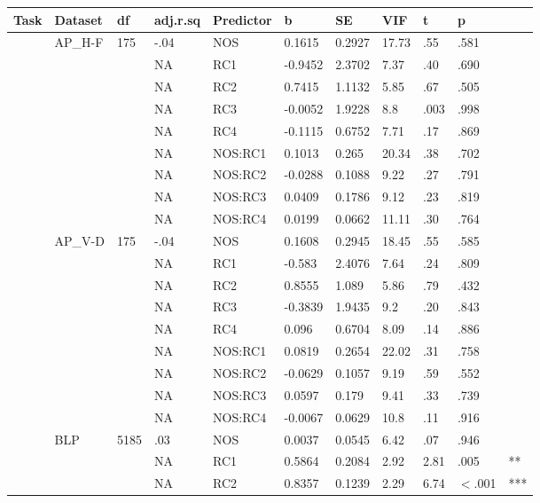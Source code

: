 \begin{table}[ht]
\centering
\begingroup\normalsize
\begin{tabular}{lllllllllll}
  \hline
Task & Dataset & df & adj.r.sq & Predictor & b & SE & VIF & t & p &  \\ 
  \hline
 & AP\_H-F & 175 & -.04 & NOS & 0.1615 & 0.2927 & 17.73 & .55 & .581 &   \\ 
   &  &  & NA & RC1 & -0.9452 & 2.3702 & 7.37 & .40 & .690 &   \\ 
   &  &  & NA & RC2 & 0.7415 & 1.1132 & 5.85 & .67 & .505 &   \\ 
   &  &  & NA & RC3 & -0.0052 & 1.9228 & 8.8 & .003 & .998 &   \\ 
   &  &  & NA & RC4 & -0.1115 & 0.6752 & 7.71 & .17 & .869 &   \\ 
   &  &  & NA & NOS:RC1 & 0.1013 & 0.265 & 20.34 & .38 & .702 &   \\ 
   &  &  & NA & NOS:RC2 & -0.0288 & 0.1088 & 9.22 & .27 & .791 &   \\ 
   &  &  & NA & NOS:RC3 & 0.0409 & 0.1786 & 9.12 & .23 & .819 &   \\ 
   &  &  & NA & NOS:RC4 & 0.0199 & 0.0662 & 11.11 & .30 & .764 &   \\ 
   & AP\_V-D & 175 & -.04 & NOS & 0.1608 & 0.2945 & 18.45 & .55 & .585 &   \\ 
   &  &  & NA & RC1 & -0.583 & 2.4076 & 7.64 & .24 & .809 &   \\ 
   &  &  & NA & RC2 & 0.8555 & 1.089 & 5.86 & .79 & .432 &   \\ 
   &  &  & NA & RC3 & -0.3839 & 1.9435 & 9.2 & .20 & .843 &   \\ 
   &  &  & NA & RC4 & 0.096 & 0.6704 & 8.09 & .14 & .886 &   \\ 
   &  &  & NA & NOS:RC1 & 0.0819 & 0.2654 & 22.02 & .31 & .758 &   \\ 
   &  &  & NA & NOS:RC2 & -0.0629 & 0.1057 & 9.19 & .59 & .552 &   \\ 
   &  &  & NA & NOS:RC3 & 0.0597 & 0.179 & 9.41 & .33 & .739 &   \\ 
   &  &  & NA & NOS:RC4 & -0.0067 & 0.0629 & 10.8 & .11 & .916 &   \\ 
   & BLP & 5185 & .03 & NOS & 0.0037 & 0.0545 & 6.42 & .07 & .946 &   \\ 
   &  &  & NA & RC1 & 0.5864 & 0.2084 & 2.92 & 2.81 & .005 & ** \\ 
   &  &  & NA & RC2 & 0.8357 & 0.1239 & 2.29 & 6.74 & $<$.001 & *** \\ 

\end{tabular}
\end{table}
